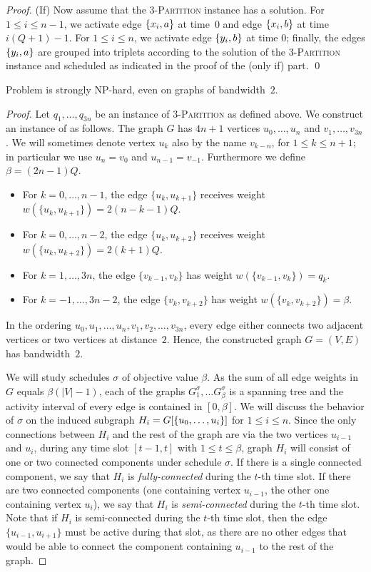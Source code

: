\begin{proof}
(If) Now assume that the \textsc{3-Partition} instance has a solution. 
For $1\le i\le n-1$, we activate edge $\{ x_i,a \}$ at time~$0$ and edge $\{ x_i,b \}$ at time $i(Q+1)-1$.
For $1\le i\le n$, we activate edge $\{ y_i,b \}$ at time $0$; finally, the edges $\{ y_i,a \}$ are
grouped into triplets according to the solution of the \textsc{3-Partition} instance and scheduled
as indicated in the proof of the (only if) part.
\qed
\end{proof}

\begin{theorem}
\label{thm:hardness_bandwidth}
Problem {\xxxNTP} is strongly NP-hard, even on graphs of bandwidth~$2$.
\end{theorem}
\begin{proof}
Let $q_1,\ldots,q_{3n}$ be an instance of \textsc{3-Partition} as defined above.
We construct an instance of {\xxxNTP} as follows.
The graph $G$ has $4n+1$ vertices $u_0,\ldots,u_n$ and $v_1,\ldots,v_{3n}$.
We will sometimes denote vertex $u_k$ also by the name $v_{k-n}$, for $1\le k\le n+1$;
in particular we use $u_n=v_0$ and $u_{n-1}=v_{-1}$.
Furthermore we define $\beta=(2n-1)Q$.
\begin{itemize}
\item 
For $k=0,\ldots,n-1$,   the edge $\{u_k, u_{k+1}\}$ receives weight $w(\{u_k, u_{k+1}\}) = 2(n-k-1)Q$.
\item
For $k=0,\ldots,n-2$,   the edge $\{u_k, u_{k+2}\}$ receives weight $w(\{u_k, u_{k+2}\})=2(k+1)Q$.
\item 
For $k=1,\ldots,3n$,    the edge $\{v_{k-1}, v_k\}$ has weight $w(\{v_{k-1}, v_k\})=q_k$.
\item
For $k=-1,\ldots,3n-2$, the edge $\{v_k, v_{k+2}\}$ has weight $w(\{v_k, v_{k+2}\})=\beta$.  
\end{itemize}
In the ordering $u_0,u_1,\ldots,u_n,v_1,v_2,\ldots,v_{3n}$, every edge either connects two adjacent 
vertices or two vertices at distance~$2$. Hence, the constructed graph $G=(V,E)$ has bandwidth~$2$. 

We will study schedules $\sigma$ of objective value $\beta$. 
As the sum of all edge weights in $G$ equals $\beta(|V|-1)$, each of the graphs 
$G^\sigma_1, \dots G^\sigma_\beta$ is a spanning tree and the activity interval of every edge is contained in $[0, \beta]$.
We will discuss the behavior of $\sigma$ on the induced subgraph $H_i = G[\{ u_0, \ldots, u_i \}]$ for $1\le i\le n$.
Since the only connections between $H_i$ and the rest of the graph are via the two vertices $u_{i-1}$ and $u_i$,
during any time slot $[t-1,t]$ with $1\le t\le\beta$, graph $H_i$ will consist of one or two connected components
under schedule $\sigma$.
If there is a single connected component, we say that $H_i$ is \emph{fully-connected} during the $t$-th time slot.
If there are two connected components (one containing vertex $u_{i-1}$, the other one containing 
vertex $u_i$), we say that $H_i$ is \emph{semi-connected} during the $t$-th time slot.
Note that if $H_i$ is semi-connected during the $t$-th time slot, then the edge $\{u_{i-1}, u_{i+1}\}$ must be 
active during that slot, as there are no other edges that would be able to connect the component containing 
$u_{i-1}$ to the rest of the graph.


\end{proof}
